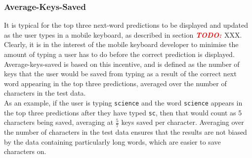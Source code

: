 \documentclass[a4paper, 12pt]{report}
\newcommand{\todo}{\textbf{\textit{\textcolor{red}{TODO: }}}}
\newcommand{\ttt}[1]{\texttt{#1}}
\begin{document}
%

\subsubsection{Average-Keys-Saved}

It is typical for the top three next-word predictions to be displayed and updated as the user types in a mobile keyboard, as described in section \todo{XXX}. Clearly, it is in the interest of the mobile keyboard developer to minimise the amount of typing a user has to do before the correct prediction is displayed. Average-keys-saved is based on this incentive, and is defined as the number of keys that the user would be saved from typing as a result of the correct next word appearing in the top three predictions, averaged over the number of characters in the test data. \\

As an example, if the user is typing \ttt{science} and the word \ttt{science} appears in the top three predictions after they have typed \ttt{sc}, then that would count as 5 characters being saved, averaging at $\frac{5}{7}$ keys saved per character. Averaging over the number of characters in the test data ensures that the results are not biased by the data containing particularly long words, which are easier to save characters on.
\end{document}
